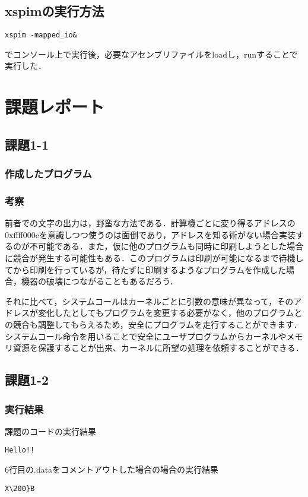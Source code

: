 \documentclass[a4j,11pt]{jarticle}
\begin{document}
\subsection{xspimの実行方法}
\begin{verbatim}
xspim -mapped_io&
\end{verbatim}
でコンソール上で実行後，必要なアセンブリファイルをloadし，runすることで実行した．
\section{課題レポート}

 \subsection{課題1-1}

  \subsubsection{作成したプログラム}

    
    

  \subsubsection{考察}
  
  前者での文字の出力は，野蛮な方法である．計算機ごとに変り得るアドレスの0xffff000cを意識しつつ使うのは面倒であり，アドレスを知る術がない場合実装するのが不可能である．また，仮に他のプログラムも同時に印刷しようとした場合に競合が発生する可能性もある．このプログラムは印刷が可能になるまで待機してから印刷を行っているが，待たずに印刷するようなプログラムを作成した場合，機器の破壊につながることもあるだろう．

それに比べて，システムコールはカーネルごとに引数の意味が異なって，そのアドレスが変化したとしてもプログラムを変更する必要がなく，他のプログラムとの競合も調整してもらえるため，安全にプログラムを走行することができます．システムコール命令を用いることで安全にユーザプログラムからカーネルやメモリ資源を保護することが出来、カーネルに所望の処理を依頼することができる．

 \subsection{課題1-2}
\subsubsection{実行結果}
  \begin{screen}
    課題のコードの実行結果
    \end{screen}
    \begin{verbatim}
Hello!!
    \end{verbatim}
  \begin{screen}
    6行目の.dataをコメントアウトした場合の場合の実行結果
    \end{screen}
    \begin{verbatim}
X\200}B
    \end{verbatim}
\end{document}
